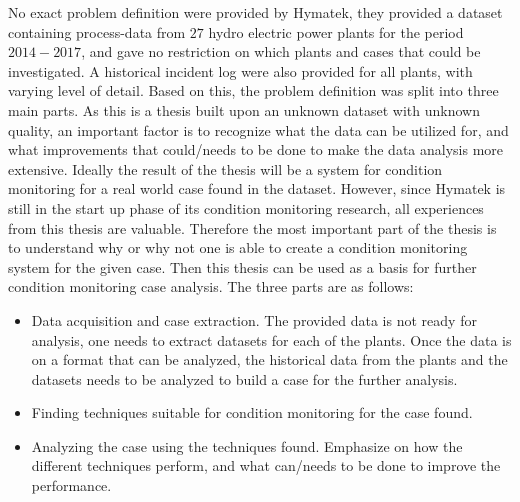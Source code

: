 No exact problem definition were provided by Hymatek, they provided a dataset containing process-data from $27$ hydro electric power plants for the period $2014-2017$, and gave no restriction on which plants and cases that could be investigated. A historical incident log were also provided for all plants, with varying level of detail. Based on this, the problem definition was split into three main parts. As this is a thesis built upon an unknown dataset with unknown quality, an important factor is to recognize what the data can be utilized for, and what improvements that could/needs to be done to make the data analysis more extensive. Ideally the result of the thesis will be a system for condition monitoring for a real world case found in the dataset. However, since Hymatek is still in the start up phase of its condition monitoring research, all experiences from this thesis are valuable. Therefore the most important part of the thesis is to understand why or why not one is able to create a condition monitoring system for the given case. Then this thesis can be used as a basis for further condition monitoring case analysis. The three parts are as follows: 

\begin{itemize}
    \item Data acquisition and case extraction. The provided data is not ready for analysis, one needs to extract datasets for each of the plants. Once the data is on a format that can be analyzed, the historical data from the plants and the datasets needs to be analyzed to build a  case for the further analysis. 
    \item Finding techniques suitable for condition monitoring for the case found.  
    \item Analyzing the case using the techniques found. Emphasize on how the different techniques perform, and what can/needs to be done to improve the performance. 
\end{itemize}


    

    
